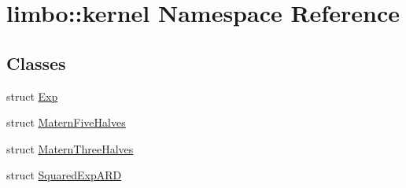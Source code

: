 \hypertarget{namespacelimbo_1_1kernel}{}\section{limbo\+:\+:kernel Namespace Reference}
\label{namespacelimbo_1_1kernel}
\subsection*{Classes}
\begin{DoxyCompactItemize}
\item 
struct \hyperlink{structlimbo_1_1kernel_1_1_exp}{Exp}
\item 
struct \hyperlink{structlimbo_1_1kernel_1_1_matern_five_halves}{Matern\+Five\+Halves}
\item 
struct \hyperlink{structlimbo_1_1kernel_1_1_matern_three_halves}{Matern\+Three\+Halves}
\item 
struct \hyperlink{structlimbo_1_1kernel_1_1_squared_exp_a_r_d}{Squared\+Exp\+A\+RD}
\end{DoxyCompactItemize}
